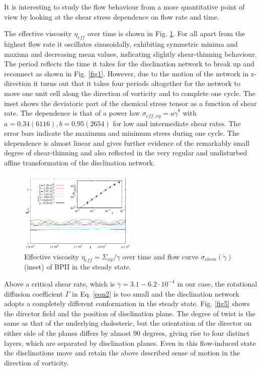 \documentclass[aps,pre,twocolumn,groupedaddress]{revtex4-1}
\begin{document}
It is interesting to study the flow behaviour from a more quantitative point of view by looking at the shear stress dependence on flow rate and time. 

The effective viscosity $\eta_{eff}$ over time is shown in Fig. \ref{fig4}. 
For all apart from the highest flow rate it oscillates sinusoidally, exhibiting symmetric minima and maxima and decreasing mean values, indicating slightly shear-thinning behaviour.
The period reflects the time it takes for the disclination network to break up and reconnect as shown in Fig. \ref{fig1}.
However, due to the motion of the network in z-direction it turns out that it takes four periods altogether for the network to move one unit cell along the direction of vorticity and to complete one cycle.
The inset shows the deviatoric part of the chemical stress tensor as a function of shear rate.
The dependence is that of a power law $\sigma_{eff, xy}=a \dot{\gamma}^b$ with $a=0.34(6116), b=0.95(2654)$ for low and intermediate shear rates. 
The error bars indicate the maximum and minimum stress during one cycle.
The idependence is almost linear and gives further evidence of the remarkably small degree of shear-thinning and also reflected in the very regular and undisturbed affine transformation of the disclination network.  

\begin{figure}[h]
\includegraphics[width=0.5\textwidth]{stress_bp2.pdf}
\caption{Effective viscosity $\eta_{eff}=\Sigma_{xy}/\dot{\gamma}$ over time and flow curve $\sigma_{chem}(\dot{\gamma})$ (inset) of BPII in the steady state. }
\label{fig4}
\end{figure}

Above a critical shear rate, which is $\dot{\gamma}=3.1-6.2\cdot 10^{-4}$ in our case, the rotational diffusion coefficient $\Gamma$ in Eq. \ref{eqn2} is too small and the disclination network adopts a completely different conformation in the steady state.
Fig. \ref{fig5} shows the director field and the position of disclination plane.
The degree of twist is the same as that of the underlying cholesteric, but the orientation of the director on either side of the planes differs by almost 90 degrees, giving rise to four distinct layers, which are separated by disclination planes.
Even in this flow-induced state the disclinations move and retain the above described sense of motion in the direction of vorticity.
\end{document}
